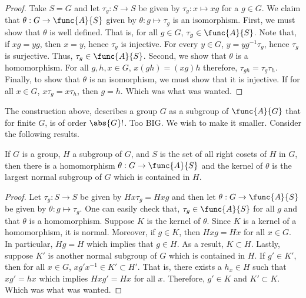 \begin{proof}
    Take \(S = G\) and let \(\tau_g: S \to S\) be given by \(\tau_g: x \mapsto xg\) for a \(g \in G\). We claim that \(\theta: G \to \func{A}{S}\) given by \(\theta: g \mapsto \tau_g\) is an isomorphism. First, we must show that \(\theta\) is well defined. That is, for all \(g \in G\), \(\tau_g \in \func{A}{S}\). Note that, if \(xg = yg\), then \(x = y\), hence \(\tau_g\) is injective. For every \(y \in G\), \(y = yg^{-1} \tau_g\), hence \(\tau_g\) is surjective. Thus, \(\tau_g \in \func{A}{S}\). Second, we show that \(\theta\) is a homomorphism. For all \(g,h,x \in G\), \(x(gh) = (xg)h\) therefore, \(\tau_{gh} = \tau_g \tau_h\). Finally, to show that \(\theta\) is an isomorphism, we must show that it is injective. If for all \(x \in G\), \(x\tau_g = x\tau_h\), then \(g = h\). Which was what was wanted.
\end{proof}

The construction above, describes a group \(G\) as a subgroup of \(\func{A}{G}\) that for finite \(G\), is of order \(\abs{G}!\). Too BIG. We wish to make it smaller. Consider the following results.

\begin{theorem}
    If \(G\) is a group, \(H\) a subgroup of \(G\), and \(S\) is the set of all right cosets of \(H\) in \(G\), then there is a homomorphism \(\theta: G \to \func{A}{S}\) and the kernel of \(\theta\) is the largest normal subgroup of \(G\) which is contained in \(H\).
\end{theorem}

\begin{proof}
    Let \(\tau_g: S \to S\) be given by \(Hx \tau_g = Hxg\) and then let \(\theta: G \to \func{A}{S}\) be given by \(\theta: g \mapsto \tau_g\). One can easily check that, \(\tau_g \in \func{A}{S}\) for all \(g\) and that \(\theta\) is a homomorphism. Suppose \(K\) is the kernel of \(\theta\). Since \(K\) is a kernel of a homomorphism, it is normal. Moreover, if \(g \in K\), then \(Hxg = Hx\) for all \(x \in G\). In particular, \(Hg = H\) which implies that \(g \in H\). As a result, \(K \subset H\). Lastly, suppose \(K'\) is another normal subgroup of \(G\) which is contained in \(H\). If \(g' \in K'\), then for all \(x \in G\), \(xg' x^{-1} \in K' \subset H'\). That is, there exists a \(h_x \in H\) such that \(xg' = hx\) which implies \(Hxg' = Hx\) for all \(x\). Therefore, \(g' \in K\) and \(K' \subset K\). Which was what was wanted.
\end{proof}

